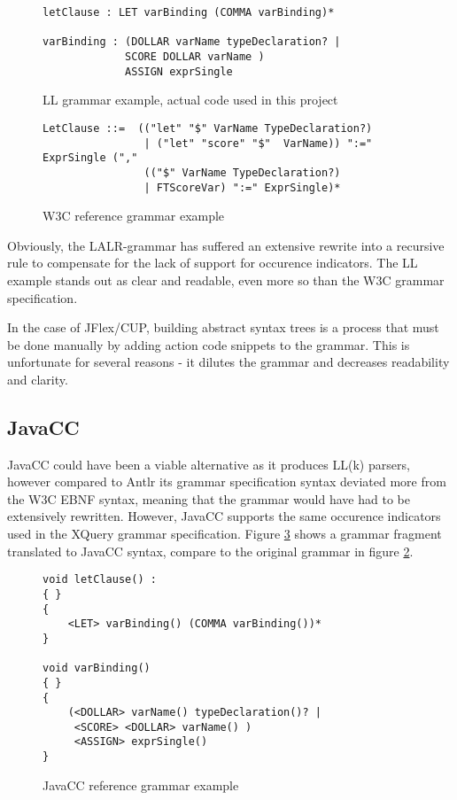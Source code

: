 \begin{figure}[h!]
\begin{verbatim}
letClause : LET varBinding (COMMA varBinding)*

varBinding : (DOLLAR varName typeDeclaration? | 
             SCORE DOLLAR varName )
             ASSIGN exprSingle
\end{verbatim}
\caption[LL grammar example]{LL grammar example, actual code used in this project}
\label{code:parsers:ll}
\end{figure}

\begin{figure}[h!]
\begin{verbatim}
LetClause ::=  (("let" "$" VarName TypeDeclaration?) 
 				| ("let" "score" "$"  VarName)) ":=" ExprSingle ("," 
 				(("$" VarName TypeDeclaration?) 
 				| FTScoreVar) ":=" ExprSingle)*
\end{verbatim}
\caption{ W3C reference grammar example }
\label{code:parsers:w3c}
\end{figure}

Obviously, the LALR-grammar has suffered an extensive rewrite into a recursive
rule to compensate for the lack of support for occurence indicators. The LL
example stands out as clear and readable, even more so than the W3C
grammar specification.

In the case of JFlex/CUP, building abstract syntax trees is a process that must
be done manually by adding action code snippets to the grammar. This is
unfortunate for several reasons - it dilutes the grammar and decreases
readability and clarity.


\subsection{JavaCC}
JavaCC could have been a viable alternative as it produces LL(k) parsers,
however compared to Antlr its grammar specification syntax deviated more
from the W3C EBNF syntax, meaning that the grammar would have had to be
extensively rewritten. However, JavaCC supports the same occurence indicators
used in the XQuery grammar specification. Figure \ref{code:parsers:javacc} shows
a grammar fragment translated to JavaCC syntax, compare to the original grammar
in figure \ref{code:parsers:w3c}.

\begin{figure}[h!]
\begin{verbatim}
void letClause() :
{ }
{
    <LET> varBinding() (COMMA varBinding())*
} 

void varBinding()
{ }
{
    (<DOLLAR> varName() typeDeclaration()? | 
     <SCORE> <DOLLAR> varName() )
     <ASSIGN> exprSingle()
}
\end{verbatim}
\caption{ JavaCC reference grammar example }
\label{code:parsers:javacc}
\end{figure}


